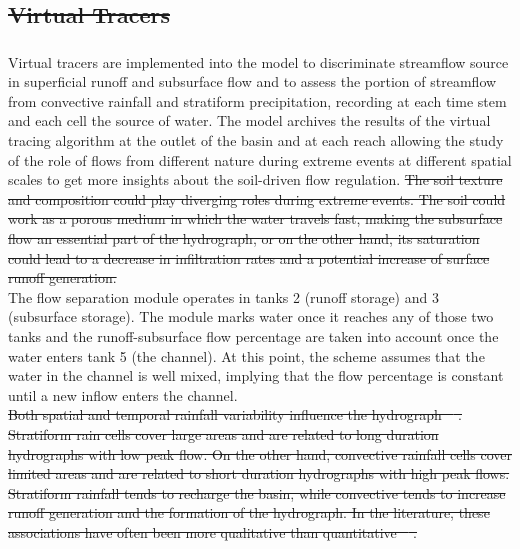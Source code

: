 \documentclass[hess, manuscript]{copernicus} %
\providecommand{\DIFadd}[1]{{\protect\color{blue}\uwave{#1}}} %
\providecommand{\DIFdel}[1]{{\protect\color{red}\sout{#1}}}                      %
\providecommand{\DIFaddbegin}{} %
\providecommand{\DIFaddend}{} %
\providecommand{\DIFdelbegin}{} %
\providecommand{\DIFdelend}{} %
\begin{document}
\DIFdelbegin \subsection{\DIFdel{Virtual Tracers}}
\addtocounter{subsection}{-1}%
\DIFdelend \DIFaddbegin \subsubsection{\DIFadd{Virtual Tracers}}
\DIFaddend 

Virtual tracers are implemented into the model to discriminate streamflow source in superficial runoff and subsurface flow and to assess the portion of streamflow from convective rainfall and stratiform precipitation, recording at each time stem and each cell the source of water.  The model archives the results of the virtual tracing algorithm at the outlet of the basin and at each reach allowing the study of the role of flows from different nature during extreme events at different spatial scales to get more insights about the soil-driven flow regulation. \DIFdelbegin \DIFdel{The soil texture and composition could play diverging roles during extreme events. The soil could work as a porous medium in which the water travels fast, making the subsurface flow an essential part of the hydrograph, or on the other hand, its saturation could lead to a decrease in infiltration rates and a potential increase of surface runoff generation.}\DIFdelend \\

The flow separation module operates in tanks 2 (runoff storage) and 3 (subsurface storage).  The module marks water once it reaches any of those two tanks and the runoff-subsurface flow percentage are taken into account once the water enters tank 5 (the channel).   At this point, the scheme assumes that the water in the channel is well mixed,  implying that the flow percentage is constant until a new inflow enters the channel.\\

\DIFdelbegin \DIFdel{Both spatial and temporal rainfall variability influence the hydrograph \mbox{%
\citet{Shope2016}}\hspace{0pt}%
. Stratiform rain cells cover large areas and are related to long duration hydrographs with low peak flow.  On the other hand, convective rainfall cells cover limited areas and are related to short duration hydrographs with high peak flows.  Stratiform rainfall tends to recharge the basin, while convective tends to increase runoff generation and the formation of the hydrograph.  In the literature, these associations have often been more qualitative than quantitative \mbox{%
\citep{Creutin2003a,Salek2006,Borga2014}}\hspace{0pt}%
.}%
\end{document}
